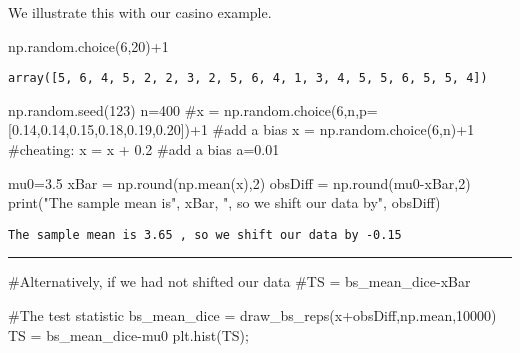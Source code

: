 \documentclass[
  letterpaper,
  DIV=11,
  numbers=noendperiod]{scrreprt}
\newenvironment{Shaded}{\begin{snugshade}}{\end{snugshade}}
\newcommand{\BuiltInTok}[1]{\textcolor[rgb]{0.00,0.23,0.31}{#1}}
\newcommand{\CommentTok}[1]{\textcolor[rgb]{0.37,0.37,0.37}{#1}}
\newcommand{\DecValTok}[1]{\textcolor[rgb]{0.68,0.00,0.00}{#1}}
\newcommand{\FloatTok}[1]{\textcolor[rgb]{0.68,0.00,0.00}{#1}}
\newcommand{\NormalTok}[1]{\textcolor[rgb]{0.00,0.23,0.31}{#1}}
\newcommand{\OperatorTok}[1]{\textcolor[rgb]{0.37,0.37,0.37}{#1}}
\newcommand{\StringTok}[1]{\textcolor[rgb]{0.13,0.47,0.30}{#1}}
\begin{document}
We illustrate this with our casino example.

\begin{Shaded}
\begin{Highlighting}[]
\NormalTok{np.random.choice(}\DecValTok{6}\NormalTok{,}\DecValTok{20}\NormalTok{)}\OperatorTok{+}\DecValTok{1}
\end{Highlighting}
\end{Shaded}

\begin{verbatim}
array([5, 6, 4, 5, 2, 2, 3, 2, 5, 6, 4, 1, 3, 4, 5, 5, 6, 5, 5, 4])
\end{verbatim}

\begin{Shaded}
\begin{Highlighting}[]
\NormalTok{np.random.seed(}\DecValTok{123}\NormalTok{)}
\NormalTok{n}\OperatorTok{=}\DecValTok{400}
\CommentTok{\#x = np.random.choice(6,n,p=[0.14,0.14,0.15,0.18,0.19,0.20])+1 \#add a bias}
\NormalTok{x }\OperatorTok{=}\NormalTok{ np.random.choice(}\DecValTok{6}\NormalTok{,n)}\OperatorTok{+}\DecValTok{1} 
\CommentTok{\#cheating:}
\NormalTok{x }\OperatorTok{=}\NormalTok{ x }\OperatorTok{+} \FloatTok{0.2} \CommentTok{\#add a bias}
\NormalTok{a}\OperatorTok{=}\FloatTok{0.01}

\NormalTok{mu0}\OperatorTok{=}\FloatTok{3.5}
\NormalTok{xBar }\OperatorTok{=}\NormalTok{ np.}\BuiltInTok{round}\NormalTok{(np.mean(x),}\DecValTok{2}\NormalTok{)}
\NormalTok{obsDiff }\OperatorTok{=}\NormalTok{ np.}\BuiltInTok{round}\NormalTok{(mu0}\OperatorTok{{-}}\NormalTok{xBar,}\DecValTok{2}\NormalTok{)}
\BuiltInTok{print}\NormalTok{(}\StringTok{"The sample mean is"}\NormalTok{, xBar, }\StringTok{", so we shift our data by"}\NormalTok{, obsDiff)}
\end{Highlighting}
\end{Shaded}

\begin{verbatim}
The sample mean is 3.65 , so we shift our data by -0.15
\end{verbatim}

\begin{center}\rule{0.5\linewidth}{0.5pt}\end{center}

\begin{Shaded}
\begin{Highlighting}[]
\CommentTok{\#Alternatively, if we had not shifted our data}
\CommentTok{\#TS = bs\_mean\_dice{-}xBar}

\CommentTok{\#The test statistic}
\NormalTok{bs\_mean\_dice }\OperatorTok{=}\NormalTok{ draw\_bs\_reps(x}\OperatorTok{+}\NormalTok{obsDiff,np.mean,}\DecValTok{10000}\NormalTok{)}
\NormalTok{TS }\OperatorTok{=}\NormalTok{ bs\_mean\_dice}\OperatorTok{{-}}\NormalTok{mu0}
\NormalTok{plt.hist(TS)}\OperatorTok{;}
\end{Highlighting}
\end{Shaded}
\end{document}
